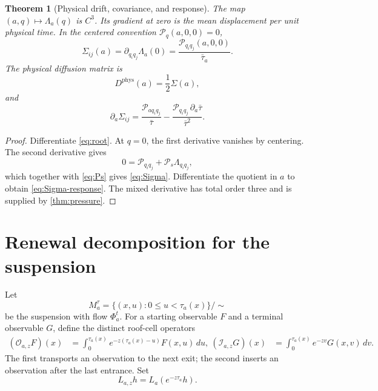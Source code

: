 \documentclass[11pt,reqno]{amsart}
\newtheorem{theorem}{Theorem}[section]
\theoremstyle{definition}
\theoremstyle{remark}
\newcommand{\cP}{\mathscr P}
\begin{document}
\begin{theorem}[Physical drift, covariance, and response]\label{thm:physical}
The map $(a,q)\mapsto\Lambda_a(q)$ is $C^3$.  Its gradient at zero is the mean
displacement per unit physical time.  In the centered convention
$\cP_q(a,0,0)=0$,
\begin{equation}\label{eq:Sigma}
 \Sigma_{ij}(a)=\partial_{q_iq_j}\Lambda_a(0)
 =\frac{\cP_{q_iq_j}(a,0,0)}{\bar\tau_a}.
\end{equation}
The physical diffusion matrix is
\begin{equation}\label{eq:Dphys}
 D^{\mathrm{phys}}(a)=\frac12\Sigma(a),
\end{equation}
and
\begin{equation}\label{eq:Sigma-response}
 \partial_a\Sigma_{ij}
 =\frac{\cP_{a q_iq_j}}{\bar\tau}
 -\frac{\cP_{q_iq_j}\,\partial_a\bar\tau}{\bar\tau^2}.
\end{equation}
\end{theorem}

\begin{proof}
Differentiate \eqref{eq:root}.  At $q=0$, the first derivative vanishes by
centering.  The second derivative gives
\[
 0=\cP_{q_iq_j}+\cP_s\Lambda_{q_iq_j},
\]
which together with \eqref{eq:Ps} gives \eqref{eq:Sigma}.  Differentiate the
quotient in $a$ to obtain \eqref{eq:Sigma-response}.  The mixed derivative has
total order three and is supplied by \cref{thm:pressure}.
\end{proof}

\section{Renewal decomposition for the suspension}\label{sec:suspension}

Let
\[
 M_a^\tau=\{(x,u):0\le u<\tau_a(x)\}/\sim
\]
be the suspension with flow $\Phi_a^t$.  For a starting observable $F$ and a
terminal observable $G$, define the distinct roof-cell operators
\begin{align}
 (\mathcal O_{a,z}F)(x)
 &=\int_0^{\tau_a(x)}
 e^{-z(\tau_a(x)-u)}F(x,u)\,du,
 \label{eq:exit}\
 (\mathcal I_{a,z}G)(x)
 &=\int_0^{\tau_a(x)}e^{-zv}G(x,v)\,dv.
 \label{eq:entry}
\end{align}
The first transports an observation to the next exit; the second inserts an
observation after the last entrance.  Set
\begin{equation}\label{eq:Lz}
 L_{a,z}h=L_a(e^{-z\tau_a}h).
\end{equation}
\end{document}
